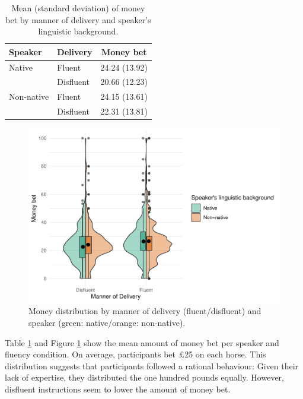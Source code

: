 \documentclass[
  man,floatsintext]{apa6}
\begin{document}
\begin{table}[tbp]

\begin{center}
\begin{threeparttable}

\caption{\label{tab:tab-dist-money}Mean (standard deviation) of money bet by manner of delivery and speaker’s linguistic
background.}

\begin{tabular}{lll}
\toprule
Speaker & \multicolumn{1}{c}{Delivery} & \multicolumn{1}{c}{Money bet}\\
\midrule
Native & Fluent & 24.24 (13.92)\\
 & Disfluent & 20.66 (12.23)\\
Non-native & Fluent & 24.15 (13.61)\\
 & Disfluent & 22.31 (13.81)\\
\bottomrule
\end{tabular}

\end{threeparttable}
\end{center}

\end{table}
\begin{figure}[H]

{\centering \includegraphics[width=0.9\linewidth,]{manuscript_eb_files/figure-latex/fig1-1} 

}

\caption{Money distribution by manner of delivery (fluent/disfluent) and speaker (green: native/orange: non-native).}\label{fig:fig1}
\end{figure}

Table \ref{tab:tab-dist-money} and Figure \ref{fig:fig1} show the mean amount of money bet per speaker and fluency condition. On average, participants bet £25 on each horse. This distribution suggests that participants followed a rational behaviour: Given their lack of expertise, they distributed the one hundred pounds equally. However, disfluent instructions seem to lower the amount of money bet.
\end{document}
